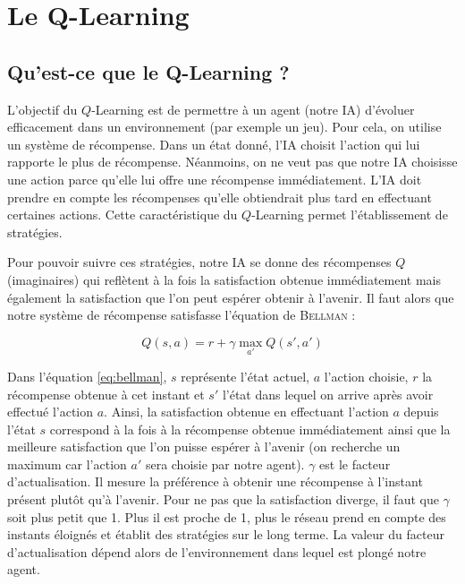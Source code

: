 \section{Le Q-Learning}

\subsection{Qu'est-ce que le Q-Learning ?}

L'objectif du $Q$-Learning est de permettre à un agent (notre IA) d'évoluer efficacement dans un environnement (par exemple un jeu). Pour cela, on utilise un système de
récompense. Dans un état donné, l'IA choisit l'action qui lui rapporte le plus de récompense. Néanmoins, on ne veut pas que notre IA choisisse une action parce qu'elle
lui offre une récompense immédiatement. L'IA doit prendre en compte les récompenses qu'elle obtiendrait plus tard en effectuant certaines actions. Cette 
caractéristique du $Q$-Learning permet l'établissement de stratégies.

Pour pouvoir suivre ces stratégies, notre IA se donne des récompenses $Q$ (imaginaires) qui reflètent à la fois la satisfaction obtenue immédiatement mais également
la satisfaction que l'on peut espérer obtenir à l'avenir. Il faut alors que notre système de récompense satisfasse l'équation de \textsc{Bellman} : 

\begin{equation}
 Q\left(s,a\right) = r + \gamma \max_{a'} Q\left(s',a'\right)
 \label{eq:bellman}
\end{equation}

Dans l'équation \ref{eq:bellman}, $s$ représente l'état actuel, $a$ l'action choisie, $r$ la récompense obtenue à cet instant et $s'$ l'état dans lequel on arrive
après avoir effectué l'action $a$. Ainsi, la satisfaction obtenue en effectuant l'action $a$ depuis l'état $s$ correspond à la fois à la récompense obtenue immédiatement
ainsi que la meilleure satisfaction que l'on puisse espérer à l'avenir (on recherche un maximum car l'action $a'$ sera choisie par notre agent). $\gamma$ est le facteur
d'actualisation. Il mesure la préférence à obtenir une récompense à l'instant présent plutôt qu'à l'avenir. Pour ne pas que la satisfaction diverge, il faut que $\gamma$
soit plus petit que 1. Plus il est proche de 1, plus le réseau prend en compte des instants éloignés et établit des stratégies sur le long terme. La valeur du facteur
d'actualisation dépend alors de l'environnement dans lequel est plongé notre agent.

